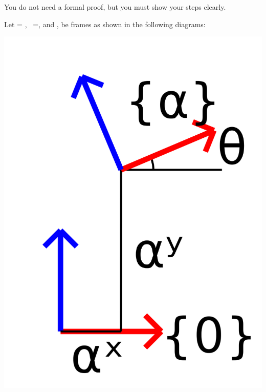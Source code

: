 \documentclass{16384_doc}
\begin{document}
\begin{questions}
    You do not need a formal proof, but you must show your steps clearly.

    \begin{tcolorbox}[height=20cm]
    \end{tcolorbox}

    \newpage

    Let  = , \th~=, and \frame{\alpha},
    \frame{\beta} be frames as shown in the following diagrams:

    \begin{center}
    \includegraphics[scale=0.1]{generated_figures/frames_4c.png}

\end{center}
\end{questions}
\end{document}
